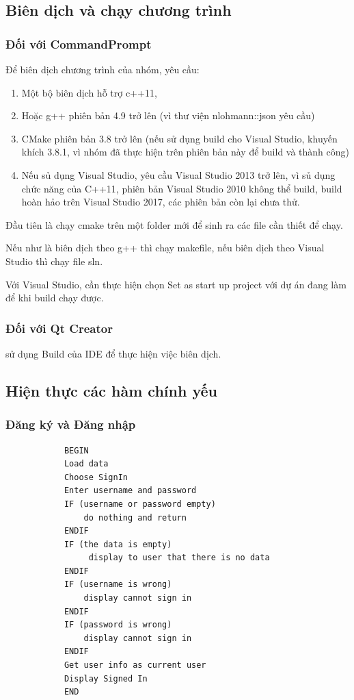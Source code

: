 \documentclass[12pt,a4paper]{report}
\begin{document}
        \subsection{Biên dịch và chạy chương trình}
        \subsubsection{Đối với CommandPrompt}
            Để biên dịch chương trình của nhóm, yêu cầu:
            \begin{enumerate}
                \item Một bộ biên dịch hỗ trợ c++11,
                \item Hoặc g++ phiên bản 4.9 trở lên (vì thư viện nlohmann::json yêu cầu)
                \item CMake phiên bản 3.8 trở lên (nếu sử dụng build cho Visual Studio, khuyến khích 3.8.1, vì nhóm đã thực hiện trên phiên bản này để build và thành công)
                \item Nếu sủ dụng Visual Studio, yêu cầu Visual Studio 2013 trở lên, vì sủ dụng chức năng của C++11, phiên bản Visual Studio 2010 không thể build, build hoàn hảo trên Visual Studio 2017, các phiên bản còn lại chưa thử.
            \end{enumerate}
            Đầu tiên là chạy cmake trên một folder mới để sinh ra các file cần thiết để chạy.\par
            Nếu như là biên dịch theo g++ thì chạy makefile, nếu biên dịch theo Visual Studio thì chạy file sln.\par
            Với Visual Studio, cần thực hiện chọn Set as start up project với dự án đang làm để khi build chạy được.\par
        \subsubsection{Đối với Qt Creator}
            sử dụng Build của IDE để thực hiện việc biên dịch.
        \subsection{Hiện thực các hàm chính yếu}
            \subsubsection{Đăng ký và Đăng nhập}
            \begin{verbatim}
            BEGIN
            Load data
            Choose SignIn
            Enter username and password
            IF (username or password empty)
                do nothing and return
            ENDIF
            IF (the data is empty)
                 display to user that there is no data
            ENDIF
            IF (username is wrong)
                display cannot sign in
            ENDIF
            IF (password is wrong)
                display cannot sign in
            ENDIF
            Get user info as current user
            Display Signed In
            END
            \end{verbatim}
\end{document}

